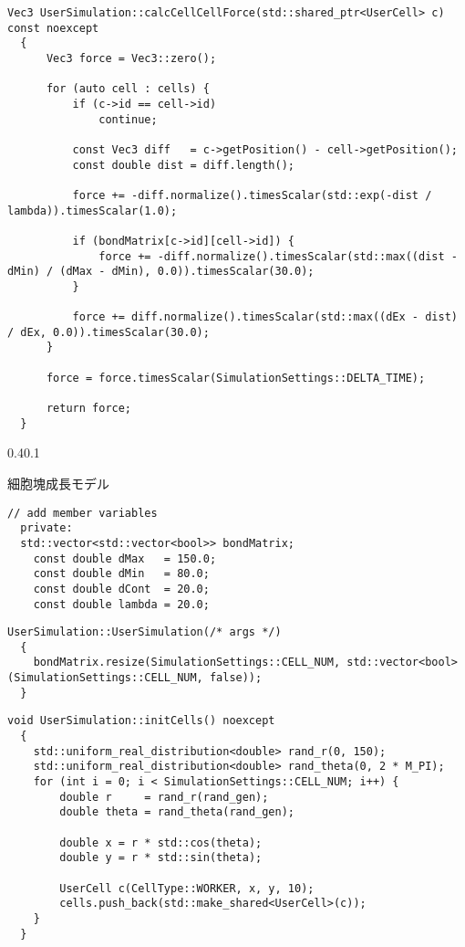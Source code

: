 \documentclass[vipdfmx,a4paper,11pt]{jsarticle}
\makeatletter
\renewcommand{\subsubsection}{%
  \@startsection{subsubsection}{1}{\z@}%
  {0.4\Cvs}{0.1\Cvs}%
  {\normalfont\large\headfont\raggedright}}
\makeatother
\begin{document}
\begin{lstlisting}[caption=calcCellCellForce()]
  Vec3 UserSimulation::calcCellCellForce(std::shared_ptr<UserCell> c) const noexcept
  {
      Vec3 force = Vec3::zero();
  
      for (auto cell : cells) {
          if (c->id == cell->id)
              continue;
  
          const Vec3 diff   = c->getPosition() - cell->getPosition();
          const double dist = diff.length();
  
          force += -diff.normalize().timesScalar(std::exp(-dist / lambda)).timesScalar(1.0);
  
          if (bondMatrix[c->id][cell->id]) {
              force += -diff.normalize().timesScalar(std::max((dist - dMin) / (dMax - dMin), 0.0)).timesScalar(30.0);
          }
  
          force += diff.normalize().timesScalar(std::max((dEx - dist) / dEx, 0.0)).timesScalar(30.0);
      }
  
      force = force.timesScalar(SimulationSettings::DELTA_TIME);
  
      return force;
  }
\end{lstlisting}

\subsubsection{細胞塊成長モデル}
\begin{lstlisting}[caption=UserSimulation.hpp]
  // add member variables
  private:
  std::vector<std::vector<bool>> bondMatrix;
    const double dMax   = 150.0;
    const double dMin   = 80.0;
    const double dCont  = 20.0;
    const double lambda = 20.0;
\end{lstlisting}

\begin{lstlisting}[caption=UserSimulation()]
  UserSimulation::UserSimulation(/* args */)
  {
    bondMatrix.resize(SimulationSettings::CELL_NUM, std::vector<bool>(SimulationSettings::CELL_NUM, false));
  }
\end{lstlisting}

\begin{lstlisting}[caption=initCells()]
  void UserSimulation::initCells() noexcept
  {
    std::uniform_real_distribution<double> rand_r(0, 150);
    std::uniform_real_distribution<double> rand_theta(0, 2 * M_PI);
    for (int i = 0; i < SimulationSettings::CELL_NUM; i++) {
        double r     = rand_r(rand_gen);
        double theta = rand_theta(rand_gen);

        double x = r * std::cos(theta);
        double y = r * std::sin(theta);

        UserCell c(CellType::WORKER, x, y, 10);
        cells.push_back(std::make_shared<UserCell>(c));
    }
  }
\end{lstlisting}
\end{document}
